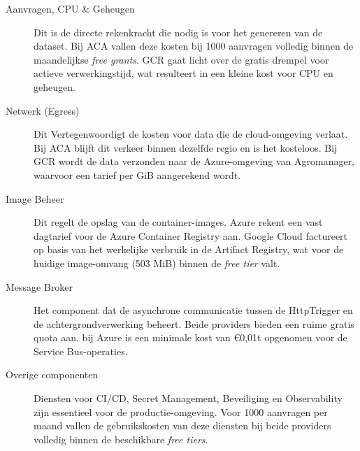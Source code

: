 \begin{description}
    \item[Aanvragen, CPU \& Geheugen]
    Dit is de directe rekenkracht die nodig is voor het genereren van de dataset. Bij ACA vallen deze kosten bij 1000 aanvragen volledig binnen de maandelijkse \textit{free grants}. GCR gaat licht over de gratis drempel voor actieve verwerkingstijd, wat resulteert in een kleine kost voor CPU en geheugen.
    \item[Netwerk (Egress)]
    Dit Vertegenwoordigt de kosten voor data die de cloud-omgeving verlaat. Bij ACA blijft dit verkeer binnen dezelfde regio en is het kosteloos. Bij GCR wordt de data verzonden naar de Azure-omgeving van Agromanager, waarvoor een tarief per GiB aangerekend wordt.
    \item[Image Beheer]
    Dit regelt de opslag van de container-images. Azure rekent een vast dagtarief voor de Azure Container Registry aan. Google Cloud factureert op basis van het werkelijke verbruik in de Artifact Registry, wat voor de huidige image-omvang (503 MiB) binnen de \textit{free tier} valt.
    \item[Message Broker]
    Het component dat de asynchrone communicatie tussen de HttpTrigger en de achtergrondverwerking beheert. Beide providers bieden een ruime gratis quota aan. bij Azure is een minimale kost van €0,01t opgenomen voor de Service Bus-operaties.
    \item[Overige componenten]
    Diensten voor CI/CD, Secret Management, Beveiliging en Observability zijn essentieel voor de productie-omgeving. Voor  1000 aanvragen per maand vallen de gebruikskosten van deze diensten bij beide providers volledig binnen de beschikbare \textit{free tiers}.
\end{description}